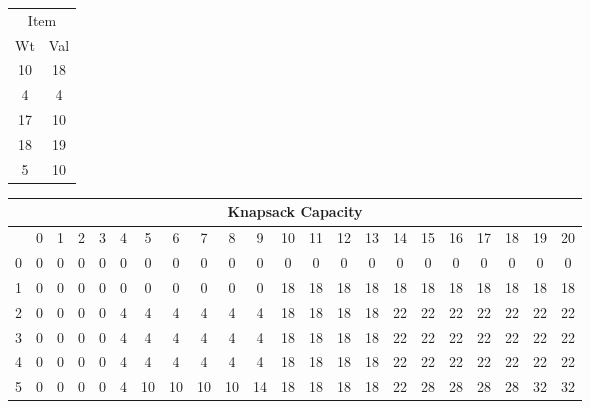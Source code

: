 \documentclass[12pt]{article}
\begin{document}
\begin{tabular}{cc}
\\
\multicolumn{2}{c}{Item}\\
Wt & Val\\\hline
10 & 18 \\\hline
4 & 4 \\\hline
17 & 10 \\\hline
18 & 19 \\\hline
5 & 10 \\\hline
\end{tabular}
\begin{tabular}{|c|c|c|c|c|c|c|c|c|c|c|c|c|c|c|c|c|c|c|c|c|c|}
\multicolumn{22}{c}{Knapsack Capacity}\\\hline
   &0 &1 &2 &3 &4 &5 &6 &7 &8 &9 &10 &11 &12 &13 &14 &15 &16 &17 &18 &19 &20\\\hline0 &0 &0 &0 &0 &0 &0 &0 &0 &0 &0 &0 &0 &0 &0 &0 &0 &0 &0 &0 &0 &0 \\\hline
1 &0 &0 &0 &0 &0 &0 &0 &0 &0 &0 &18 &18 &18 &18 &18 &18 &18 &18 &18 &18 &18 \\\hline
2 &0 &0 &0 &0 &4 &4 &4 &4 &4 &4 &18 &18 &18 &18 &22 &22 &22 &22 &22 &22 &22 \\\hline
3 &0 &0 &0 &0 &4 &4 &4 &4 &4 &4 &18 &18 &18 &18 &22 &22 &22 &22 &22 &22 &22 \\\hline
4 &0 &0 &0 &0 &4 &4 &4 &4 &4 &4 &18 &18 &18 &18 &22 &22 &22 &22 &22 &22 &22 \\\hline
5 &0 &0 &0 &0 &4 &10 &10 &10 &10 &14 &18 &18 &18 &18 &22 &28 &28 &28 &28 &32 &32 \\\hline

\end{tabular}


\vfill
\end{document}
